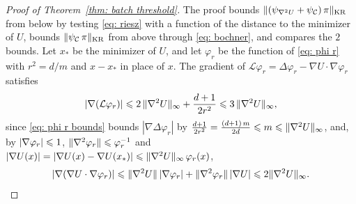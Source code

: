 \begin{proof}[Proof of Theorem~\ref{thm: batch threshold}]
    The proof bounds $\lVert ( \psi_{\nabla^2 U} + \psi_{\mathcal C} )\, \pi \rVert_{\mathrm{KR}}$ from below by testing \eqref{eq: riesz} with a function of the distance to the minimizer of $U$, bounds $\lVert \psi_{\mathcal C}\, \pi \rVert_{\mathrm{KR}}$ from above through \eqref{eq: bochner}, and compares the $2$ bounds. Let $x_*$ be the minimizer of $U$, and let $\varphi_r$ be the function of \eqref{eq: phi r} with $r^2 = d/m$ and $x - x_*$ in place of $x$. The gradient of $\mathcal L \varphi_r = \Delta \varphi_r - \nabla U \cdot \nabla \varphi_r$ satisfies
    \begin{equation}
        |\nabla (\mathcal L \varphi_r)| \leqslant 2\, \lVert \nabla^2 U \rVert_\infty + \frac{d+1}{2r^2} \leqslant 3\, \lVert \nabla^2 U \rVert_\infty ,
        \label{eq: lipschitz phi R}
    \end{equation}
    since \eqref{eq: phi r bounds} bounds $|\nabla \Delta \varphi_r|$ by $\frac{d+1}{2r^2} = \frac{(d+1)\, m}{2d} \leqslant m \leqslant \lVert \nabla^2 U \rVert_\infty$, and, by $|\nabla \varphi_r| \leqslant 1$, $\lVert \nabla^2 \varphi_r \rVert \leqslant \varphi_r^{-1}$ and $|\nabla U(x)| = |\nabla U(x) - \nabla U(x_*)| \leqslant \lVert \nabla^2 U \rVert_\infty\, \varphi_r(x)$,
    \begin{equation*}
        |\nabla(\nabla U \cdot \nabla \varphi_r)| \leqslant \lVert \nabla^2 U \rVert\, |\nabla \varphi_r| + \lVert \nabla^2 \varphi_r \rVert\, |\nabla U| \leqslant 2 \lVert \nabla^2 U \rVert_\infty .
    \end{equation*}


\end{proof}
